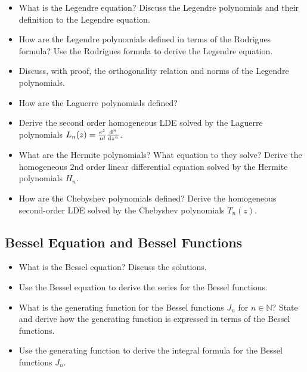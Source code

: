 \begin{itemize}

	\item What is the Legendre equation? Discuss the Legendre polynomials and their definition to the Legendre equation.
	
	\item How are the Legendre polynomials defined in terms of the Rodrigues formula? Use the Rodrigues formula to derive the Legendre equation.
	
	\item Discuss, with proof, the orthogonality relation and norms of the Legendre polynomials. 
	
	\item How are the Laguerre polynomials defined?
	
	\item Derive the second order homogeneous LDE solved by the Laguerre polynomials $L_{n}(z) = \frac{e^{z}}{n!} \dv[n]{}{z} (z^{n}e^{-z})$.
	
	\item What are the Hermite polynomials? What equation to they solve? 
    Derive the homogeneous 2nd order linear differential equation solved by the Hermite polynomials $H_{n}$. 
	
	\item How are the Chebyshev polynomials defined?
    Derive the homogeneous second-order LDE solved by the Chebyshev polynomials $ T_{n}(z) $.

\end{itemize}

\subsection{Bessel Equation and Bessel Functions}

\begin{itemize}

	\item What is the Bessel equation? Discuss the solutions.
	
	\item Use the Bessel equation to derive the series for the Bessel functions.
	
	\item What is the generating function for the Bessel functions $ J_{n} $ for $ n \in \mathbb{N} $? State and derive how the generating function is expressed in terms of the Bessel functions.
	
	\item Use the generating function to derive the integral formula for the Bessel functions $ J_{n} $.
	
\end{itemize}








